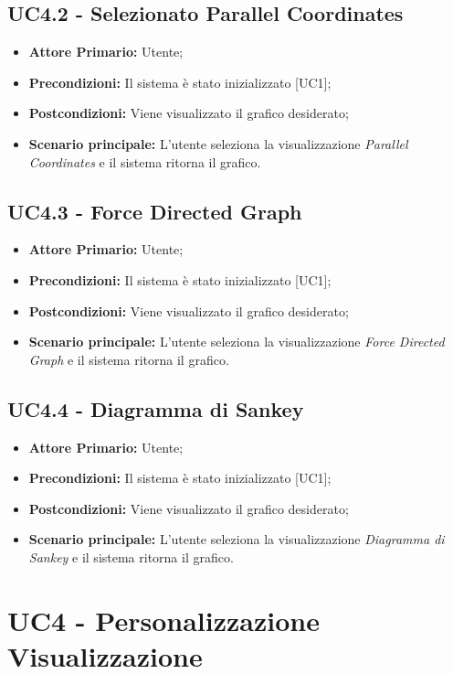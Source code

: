 \subsection{UC4.2 - Selezionato Parallel Coordinates}
\begin{itemize}
   \item \textbf{Attore Primario:} Utente;
   \item \textbf{Precondizioni:} Il sistema è stato inizializzato [UC1];
   \item \textbf{Postcondizioni:} Viene visualizzato il grafico desiderato;
   \item \textbf{Scenario principale:} L'utente seleziona la visualizzazione \textit{Parallel Coordinates} e il sistema ritorna il grafico.
\end{itemize}
\subsection{UC4.3 - Force Directed Graph}
\begin{itemize}
   \item \textbf{Attore Primario:} Utente;
   \item \textbf{Precondizioni:} Il sistema è stato inizializzato [UC1];
   \item \textbf{Postcondizioni:} Viene visualizzato il grafico desiderato;
   \item \textbf{Scenario principale:} L'utente seleziona la visualizzazione \textit{Force Directed Graph} e il sistema ritorna il grafico.
\end{itemize}
\subsection{UC4.4 - Diagramma di Sankey}
\begin{itemize}
   \item \textbf{Attore Primario:} Utente;
   \item \textbf{Precondizioni:} Il sistema è stato inizializzato [UC1];
   \item \textbf{Postcondizioni:} Viene visualizzato il grafico desiderato;
   \item \textbf{Scenario principale:} L'utente seleziona la visualizzazione \textit{Diagramma di Sankey} e il sistema ritorna il grafico.
\end{itemize}


\section{UC4 - Personalizzazione Visualizzazione}


